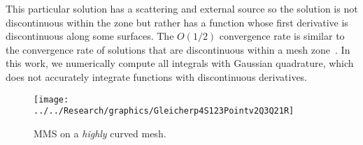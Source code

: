 \documentclass{article}
\begin{document}
This particular solution has a scattering and external source so the solution is not discontinuous within the zone but rather has a function whose first derivative is discontinuous along some surfaces. The $O(1/2)$ convergence rate is similar to the convergence rate of solutions that are discontinuous within a mesh zone~\cite{WangDGFEMConvergence}. In this work, we numerically compute all integrals with Gaussian quadrature, which does not accurately integrate functions with discontinuous derivatives.

\begin{figure}[!htb]
\texttt{[image: ../../Research/graphics/Gleicherp4S123Pointv2Q3Q21R]}
\caption{MMS on a \emph{highly} curved mesh.}
\label{fig:Gleicherp4S123Pointv2Q3Q21R}
\end{figure}
\end{document}
